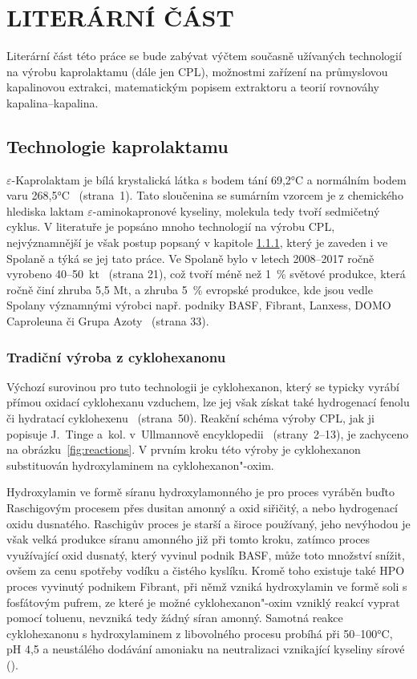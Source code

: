 
\newpage \section{LITERÁRNÍ ČÁST} \label{lit}
Literární část této práce se bude zabývat výčtem současně užívaných technologií na výrobu kaprolaktamu (dále jen CPL), možnostmi zařízení na průmyslovou kapalinovou extrakci, matematickým popisem extraktoru a teorií rovnováhy kapalina--kapalina.

\subsection{Technologie kaprolaktamu} \label{CPLtechnology}
$\varepsilon$-Kaprolaktam je bílá krystalická látka s bodem tání 69,2°C a normálním bodem varu 268,5°C~\cite{Ullmann_CPL} (strana~1).
Tato sloučenina se sumárním vzorcem  je z chemického hlediska laktam $\varepsilon$-aminokapronové kyseliny, molekula tedy tvoří sedmičetný cyklus.
V literatuře je popsáno mnoho technologií na výrobu CPL, nejvýznamnější je však postup popsaný v kapitole \ref{CHON}, který je zaveden i ve Spolaně a týká se jej tato práce.
Ve Spolaně bylo v letech 2008--2017 ročně vyrobeno 40--50~kt~\cite{ECHA_Spolana_CPL} (strana 21), což tvoří méně než 1~\% světové produkce, která ročně činí zhruba 5,5 Mt, a zhruba 5~\% evropské produkce, kde jsou vedle Spolany významnými výrobci např. podniky BASF, Fibrant, Lanxess, DOMO Caproleuna či Grupa Azoty~\cite{ECHA_Spolana_CPL} (strana 33).

\subsubsection{Tradiční výroba z cyklohexanonu} \label{CHON}
Výchozí surovinou pro tuto technologii je cyklohexanon, který se typicky vyrábí přímou oxidací cyklohexanu vzduchem, lze jej však získat také hydrogenací fenolu či hydratací cyklohexenu~\cite{Ullmann_CHON} (strana~50).
Reakční schéma výroby CPL, jak ji popisuje J.~Tinge a~kol. v~Ullmannově encyklopedii~\cite{Ullmann_CPL} (strany~2--13), je zachyceno na obrázku~\ref{fig:reactions}.
V prvním kroku této výroby je cyklohexanon substituován hydroxylaminem na cyklohexanon"-oxim.

Hydroxylamin ve formě síranu hydroxylamonného je pro proces vyráběn buďto Raschigovým procesem přes dusitan amonný a oxid siřičitý, a nebo hydrogenací oxidu dusnatého.
Raschigův proces je starší a široce používaný, jeho nevýhodou je však velká produkce síranu amonného již při tomto kroku, zatímco proces využívající oxid dusnatý, který vyvinul podnik BASF, může toto množství snížit, ovšem za cenu spotřeby vodíku a čistého kyslíku.
Kromě toho existuje také HPO proces vyvinutý podnikem Fibrant, při němž vzniká hydroxylamin ve formě soli s fosfátovým pufrem, ze které je možné cyklohexanon"-oxim vzniklý reakcí vyprat pomocí toluenu, nevzniká tedy žádný síran amonný.
Samotná reakce cyklohexanonu s hydroxylaminem z libovolného procesu probíhá při 50--100°C, pH 4,5 a neustálého dodávání amoniaku na neutralizaci vznikající kyseliny sírové ().

